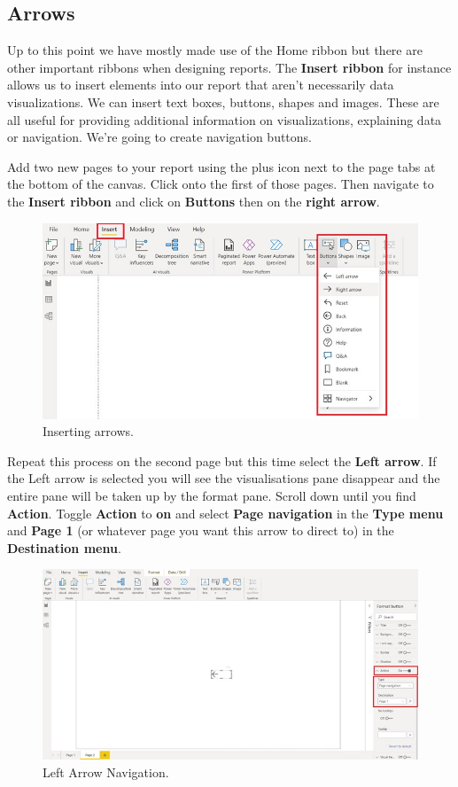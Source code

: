 \documentclass[
]{book}
\begin{document}
\hypertarget{arrows}{%
\subsection{Arrows}\label{arrows}}

Up to this point we have mostly made use of the Home ribbon but there are other important ribbons when designing reports. The \textbf{Insert ribbon} for instance allows us to insert elements into our report that aren't necessarily data visualizations. We can insert text boxes, buttons, shapes and images. These are all useful for providing additional information on visualizations, explaining data or navigation. We're going to create navigation buttons.

Add two new pages to your report using the plus icon next to the page tabs at the bottom of the canvas. Click onto the first of those pages. Then navigate to the \textbf{Insert ribbon} and click on \textbf{Buttons} then on the \textbf{right arrow}.

\begin{figure}
\centering
\includegraphics{bi11.jpg}
\caption{Inserting arrows.}
\end{figure}

Repeat this process on the second page but this time select the \textbf{Left arrow}. If the Left arrow is selected you will see the visualisations pane disappear and the entire pane will be taken up by the format pane. Scroll down until you find \textbf{Action}. Toggle \textbf{Action} to \textbf{on} and select \textbf{Page navigation} in the \textbf{Type menu} and \textbf{Page 1} (or whatever page you want this arrow to direct to) in the \textbf{Destination menu}.

\begin{figure}
\centering
\includegraphics{bi12.jpg}
\caption{Left Arrow Navigation.}
\end{figure}
\end{document}
